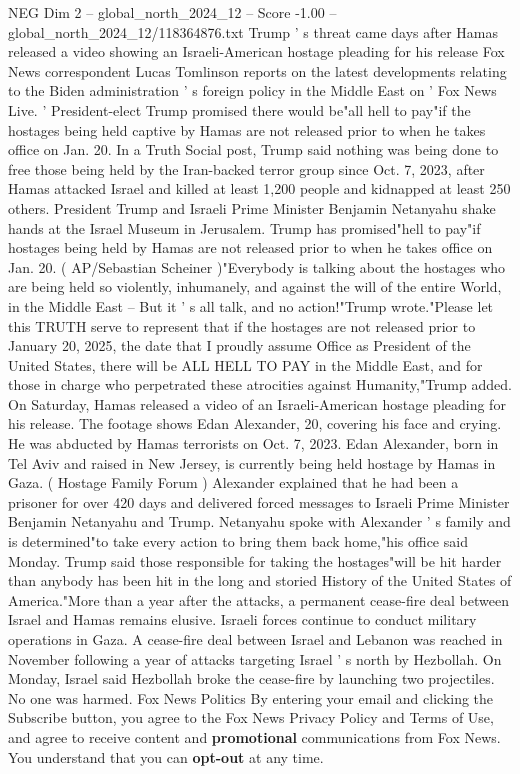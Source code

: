\begin{textsample}{NEG Dim 2 – global\_north\_2024\_12 – Score -1.00 – global\_north\_2024\_12/118364876.txt}  \label{ex:f2_neg_261}
Trump ' s threat came days after Hamas released a video showing an Israeli-American hostage pleading for his release Fox News correspondent Lucas Tomlinson reports on the latest developments relating to the Biden administration ' s foreign policy in the Middle East on ' Fox News Live. ' President-elect Trump promised there would be"all hell to pay"if the hostages being held captive by Hamas are not released prior to when he takes office on Jan. 20.
In a Truth Social post, Trump said nothing was being done to free those being held by the Iran-backed terror group since Oct. 7, 2023, after Hamas attacked Israel and killed at least 1,200 people and kidnapped at least 250 others.
President Trump and Israeli Prime Minister Benjamin Netanyahu shake hands at the Israel Museum in Jerusalem.
Trump has promised"hell to pay"if hostages being held by Hamas are not released prior to when he takes office on Jan. 20. ( AP/Sebastian Scheiner )"Everybody is talking about the hostages who are being held so violently, inhumanely, and against the will of the entire World, in the Middle East -- But it ' s all talk, and no action!"Trump wrote."Please let this TRUTH serve to represent that if the hostages are not released prior to January 20, 2025, the date that I proudly assume Office as President of the United States, there will be ALL HELL TO PAY in the Middle East, and for those in charge who perpetrated these atrocities against Humanity,"Trump added.
On Saturday, Hamas released a video of an Israeli-American hostage pleading for his release.
The footage shows Edan Alexander, 20, covering his face and crying.
He was abducted by Hamas terrorists on Oct. 7, 2023.
Edan Alexander, born in Tel Aviv and raised in New Jersey, is currently being held hostage by Hamas in Gaza. ( Hostage Family Forum ) Alexander explained that he had been a prisoner for over 420 days and delivered forced messages to Israeli Prime Minister Benjamin Netanyahu and Trump.
Netanyahu spoke with Alexander ' s family and is determined"to take every action to bring them back home,"his office said Monday.
Trump said those responsible for taking the hostages"will be hit harder than anybody has been hit in the long and storied History of the United States of America."More than a year after the attacks, a permanent cease-fire deal between Israel and Hamas remains elusive.
Israeli forces continue to conduct military operations in Gaza.
A cease-fire deal between Israel and Lebanon was reached in November following a year of attacks targeting Israel ' s north by Hezbollah.
On Monday, Israel said Hezbollah broke the cease-fire by launching two projectiles.
No one was harmed.
Fox News Politics By entering your email and clicking the Subscribe button, you agree to the Fox News Privacy Policy and Terms of Use, and agree to receive content and \textbf{promotional} communications from Fox News.
You understand that you can \textbf{opt-out} at any time.

\end{textsample}

